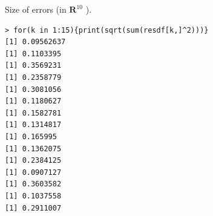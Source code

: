 \documentclass{amsart}
\begin{document}
Size of errors (in $\mathbf{R}^{10}$ ).

\begin{verbatim}
> for(k in 1:15){print(sqrt(sum(resdf[k,]^2)))}
[1] 0.09562637
[1] 0.1103395
[1] 0.3569231
[1] 0.2358779
[1] 0.3081056
[1] 0.1180627
[1] 0.1582781
[1] 0.1314817
[1] 0.165995
[1] 0.1362075
[1] 0.2384125
[1] 0.0907127
[1] 0.3603582
[1] 0.1037558
[1] 0.2911007
\end{verbatim}
\end{document}
